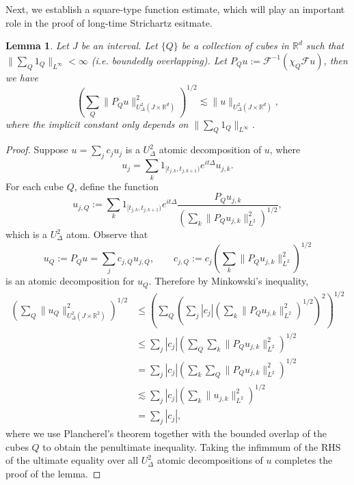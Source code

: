 \documentclass[reqno,11pt]{amsart}
\theoremstyle{plain}
\newtheorem{lemma}[theorem]{Lemma}
\theoremstyle{definition}
\numberwithin{equation}{section}
\numberwithin{theorem}{section}
\def\leq{\leqslant}
\def\R{\mathbb{R}}
\begin{document}
Next, we establish a square-type function estimate, which will play an important role in the proof of long-time Strichartz esitmate.
\begin{lemma}\label{Xdeltanorm}
Let $J$ be an interval. Let $\{Q\}$ be a collection of cubes in $\R^{d}$ such that $\|\sum_{Q}1_{Q}\|_{L^{\infty}}<\infty$ (i.e. boundedly overlapping). Let $P_{Q}u:=\mathcal{F}^{-1}(\chi_{Q}\mathcal{F}u)$, then we have
\begin{equation}
\left(\sum_{Q}\|P_{Q}u\|_{U_{\Delta}^{2}(J\times\R^{d})}^{2}\right)^{1/2} \lesssim \|u\|_{U_{\Delta}^{2}(J\times\R^{d})},
\end{equation}
where the implicit constant only depends on $\|\sum_{Q}1_{Q}\|_{L^{\infty}}$.
\end{lemma}
\begin{proof}
Suppose $u=\sum_{j}c_{j}u_{j}$ is a $U_{\Delta}^{2}$ atomic decomposition of $u$, where
\begin{equation}
u_{j} = \sum_{k}1_{[t_{j,k},t_{j,k+1})} e^{it\Delta}u_{j,k}.
\end{equation}
For each cube $Q$, define the function
\begin{equation}
u_{j, Q} := \sum_{k}1_{[t_{j,k},t_{j,k+1})}e^{it\Delta}\frac{P_{Q}u_{j,k}}{(\sum_{k}\|P_{Q}u_{j,k}\|_{L^{2}}^{2})^{1/2}},
\end{equation}
which is a $U_{\Delta}^{2}$ atom. Observe that 
\begin{equation}
u_{Q} := P_{Q}u = \sum_{j}c_{j,Q}u_{j, Q}, \qquad c_{j, Q} := c_{j}\left({\sum_{k}\|P_{Q}u_{j, k}\|_{L^{2}}^{2}}\right)^{1/2}
\end{equation}
is an atomic decomposition for $u_{Q}$. Therefore by Minkowski's inequality,
\begin{align}
\left(\sum_{Q}\|u_{Q}\|_{U_{\Delta}^{2}(J\times\R^{2})}^{2}\right)^{1/2} &\leq \left(\sum_{Q} \left(\sum_{j}|c_{j}|\left(\sum_{k}\|P_{Q}u_{j, k}\|_{L^{2}}^{2}\right)^{1/2}\right)^{2} \right)^{1/2}\nonumber\\
&\leq \sum_{j}|c_{j}| \left(\sum_{Q}\sum_{k}\|P_{Q}u_{j,k}\|_{L^{2}}^{2}\right)^{1/2} \nonumber\\
&= \sum_{j}|c_{j}| \left(\sum_{k}\sum_{Q}\|P_{Q}u_{j, k}\|_{L^{2}}^{2}\right)^{1/2} \nonumber\\
&\lesssim \sum_{j}|c_{j}|\left(\sum_{k}\|u_{j, k}\|_{L^{2}}^{2}\right)^{1/2}\nonumber\\
&= \sum_{j}|c_{j}|,
\end{align}
where we use Plancherel's theorem together with the bounded overlap of the cubes $Q$ to obtain the penultimate inequality. Taking the infimmum of the RHS of the ultimate equality over all $U_{\Delta}^{2}$ atomic decompositions of $u$ completes the proof of the lemma.
\end{proof}
\end{document}
